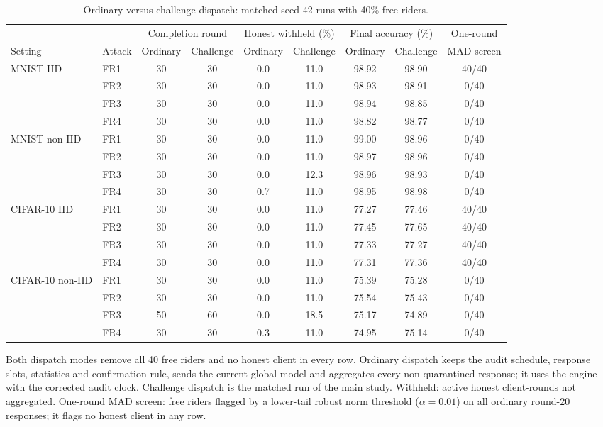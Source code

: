 \begin{table}[t]\centering\footnotesize\setlength{\tabcolsep}{4.5pt}
\caption{Ordinary versus challenge dispatch: matched seed-42 runs with 40\% free riders.}\label{tab:passive}
\begin{tabular}{llcccccc@{\hspace{10pt}}c}\toprule
& & \multicolumn{2}{c}{Completion round} & \multicolumn{2}{c}{Honest withheld (\%)} & \multicolumn{2}{c}{Final accuracy (\%)} & One-round \\
\cmidrule(lr){3-4}\cmidrule(lr){5-6}\cmidrule(lr){7-8}
Setting & Attack & Ordinary & Challenge & Ordinary & Challenge & Ordinary & Challenge & MAD screen \\ \midrule
MNIST IID & FR1 & 30 & 30 & 0.0 & 11.0 & 98.92 & 98.90 & 40/40 \\
 & FR2 & 30 & 30 & 0.0 & 11.0 & 98.93 & 98.91 & 0/40 \\
 & FR3 & 30 & 30 & 0.0 & 11.0 & 98.94 & 98.85 & 0/40 \\
 & FR4 & 30 & 30 & 0.0 & 11.0 & 98.82 & 98.77 & 0/40 \\
\midrule
MNIST non-IID & FR1 & 30 & 30 & 0.0 & 11.0 & 99.00 & 98.96 & 0/40 \\
 & FR2 & 30 & 30 & 0.0 & 11.0 & 98.97 & 98.96 & 0/40 \\
 & FR3 & 30 & 30 & 0.0 & 12.3 & 98.96 & 98.93 & 0/40 \\
 & FR4 & 30 & 30 & 0.7 & 11.0 & 98.95 & 98.98 & 0/40 \\
\midrule
CIFAR-10 IID & FR1 & 30 & 30 & 0.0 & 11.0 & 77.27 & 77.46 & 40/40 \\
 & FR2 & 30 & 30 & 0.0 & 11.0 & 77.45 & 77.65 & 40/40 \\
 & FR3 & 30 & 30 & 0.0 & 11.0 & 77.33 & 77.27 & 40/40 \\
 & FR4 & 30 & 30 & 0.0 & 11.0 & 77.31 & 77.36 & 40/40 \\
\midrule
CIFAR-10 non-IID & FR1 & 30 & 30 & 0.0 & 11.0 & 75.39 & 75.28 & 0/40 \\
 & FR2 & 30 & 30 & 0.0 & 11.0 & 75.54 & 75.43 & 0/40 \\
 & FR3 & 50 & 60 & 0.0 & 18.5 & 75.17 & 74.89 & 0/40 \\
 & FR4 & 30 & 30 & 0.3 & 11.0 & 74.95 & 75.14 & 0/40 \\
\bottomrule
\end{tabular}
\par\smallskip\parbox{.96\textwidth}{\scriptsize Both dispatch modes remove all 40 free riders and no honest client in every row. Ordinary dispatch keeps the audit schedule, response slots, statistics and confirmation rule, sends the current global model and aggregates every non-quarantined response; it uses the engine with the corrected audit clock. Challenge dispatch is the matched run of the main study. Withheld: active honest client-rounds not aggregated. One-round MAD screen: free riders flagged by a lower-tail robust norm threshold ($\alpha=0.01$) on all ordinary round-20 responses; it flags no honest client in any row.}
\end{table}
